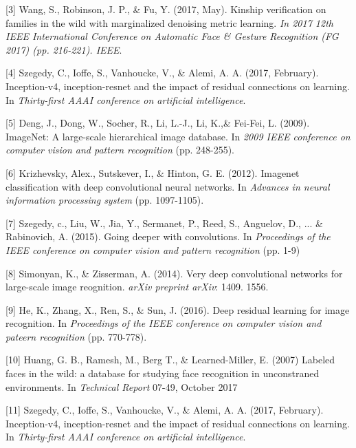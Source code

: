 \documentclass{article}
\begin{document}
[3] Wang, S., Robinson, J. P., \& Fu, Y. (2017, May). Kinship verification on
families in the wild with marginalized denoising metric learning. {\it In 2017 12th
IEEE International Conference on Automatic Face \& Gesture Recognition (FG 2017)
(pp. 216-221). IEEE}.

[4] Szegedy, C., Ioffe, S., Vanhoucke, V., \& Alemi, A. A. (2017, February).
Inception-v4, inception-resnet and the impact of residual connections on
learning. In {\it Thirty-first AAAI conference on artificial intelligence}.

[5] Deng, J., Dong, W., Socher, R., Li, L.-J., Li, K.,\& Fei-Fei, L. (2009).
ImageNet: A large-scale hierarchical image database. In {\it 2009 IEEE
conference on computer vision and pattern recognition} (pp. 248-255).

[6] Krizhevsky, Alex., Sutskever, I., \& Hinton, G. E. (2012). Imagenet
classification with deep convolutional neural networks. In {\it Advances in
neural information processing system} (pp. 1097-1105).

[7] Szegedy, c., Liu, W., Jia, Y., Sermanet, P., Reed, S., Anguelov, D., ... \& Rabinovich, A. (2015). Going deeper with convolutions. In {\it Proceedings of the IEEE conference on computer vision and pattern recognition} (pp. 1-9)

[8] Simonyan, K., \& Zisserman, A. (2014). Very deep convolutional networks for large-scale image reognition. {\it arXiv preprint arXiv}: 1409. 1556.

[9] He, K., Zhang, X., Ren, S., \& Sun, J. (2016). Deep residual learning for image recognition. In {\it Proceedings of the IEEE conference on computer vision and pateern recognition} (pp. 770-778).

[10] Huang, G. B., Ramesh, M., Berg T., \& Learned-Miller, E. (2007) Labeled faces in the wild: a database for studying face recognition in unconstraned environments. In {\it Technical Report} 07-49, October 2017

[11] Szegedy, C., Ioffe, S., Vanhoucke, V., \& Alemi, A. A. (2017, February). Inception-v4, inception-resnet and the impact of residual connections on learning. In {\it Thirty-first AAAI conference on artificial intelligence}.
\end{document}
